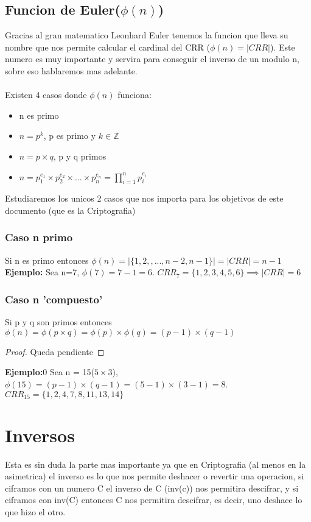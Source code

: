 \documentclass{article}
\begin{document}
\subsection{Funcion de Euler($\phi(n)$)}
\label{fn_euler}
Gracias al gran matematico Leonhard Euler tenemos la funcion que lleva su nombre
que nos permite calcular el cardinal del CRR ($\phi(n) = \vert CRR \vert$). Este numero
es muy importante y servira para conseguir el inverso de un modulo n, sobre
eso hablaremos mas adelante.\\\\
Existen 4 casos donde $\phi(n)$ funciona:
\begin{itemize}
    \item n es primo
    \item $n = p^{k}$, p es primo y $k \in \mathbb{Z}$
    \item $n = p \times q$, p y q primos
    \item $n = p_{1}^{e_{1}} \times p_{2}^{e_{2}} \times ... \times p_{n}^{e_{n}} = \displaystyle\prod_{i=1}^{n}p_{i}^{e_{i}}$
\end{itemize}

Estudiaremos los unicos 2 casos que nos importa para los objetivos de este documento (que es la Criptografia)

\subsubsection{Caso n primo}
Si n es primo entonces $\phi(n) = \vert \{1,2,,...,n-2,n-1\} \vert = \vert CRR \vert = n-1$\\
\textbf{Ejemplo:} Sea n=7, $\phi(7)= 7-1 = 6$. $CRR_{7}=\{1,2,3,4,5,6\} \implies \vert CRR \vert = 6$ 

\subsubsection{Caso n 'compuesto'}
Si p y q son primos entonces $\phi(n) = \phi(p \times q) = \phi(p) \times \phi(q) = (p-1) \times (q-1)$
\begin{proof}
    Queda pendiente
\end{proof}
\textbf{Ejemplo:}0 Sea n = 15($5 \times 3$), $\phi(15) = (p-1) \times (q-1) = (5-1) \times (3-1) = 8$.
$CRR_{15} = \{1,2,4,7,8,11,13,14\}$

\section{Inversos}
Esta es sin duda la parte mas importante ya que en Criptografia (al menos en la asimetrica)
el inverso es lo que nos permite deshacer o revertir una operacion, si ciframos con un numero
C el inverso de C (inv(c)) nos permitira descifrar, y si ciframos con inv(C) entonces C nos
permitira descifrar, es decir, uno deshace lo que hizo el otro.\\
\end{document}
